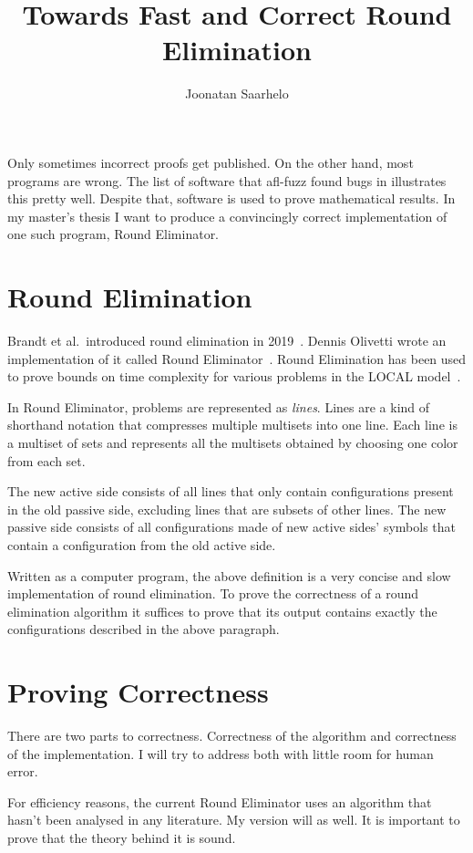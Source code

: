 \documentclass{article}
\title{Towards Fast and Correct Round Elimination}
\author{Joonatan Saarhelo}
\begin{document}
\maketitle

Only sometimes incorrect proofs get published. On the other hand, most programs are wrong. The list of software that afl-fuzz\cite{AFL} found bugs in illustrates this pretty well. Despite that, software is used to prove mathematical results. In my master's thesis I want to produce a convincingly correct implementation of one such program, Round Eliminator.

\section{Round Elimination}

Brandt et al.\ introduced round elimination in 2019\ \cite{speedup}. Dennis Olivetti wrote an implementation of it called Round Eliminator\ \cite{RE}. Round Elimination has been used to prove bounds on time complexity for various problems in the LOCAL model\ \cite{tc1, tc2, tc3}.

In Round Eliminator, problems are represented as \emph{lines}. Lines are a kind of shorthand notation that compresses multiple multisets into one line. Each line is a multiset of sets and represents all the multisets obtained by choosing one color from each set.\ \cite{RE}

The new active side consists of all lines that only contain configurations present in the old passive side, excluding lines that are subsets of other lines. The new passive side consists of all configurations made of new active sides' symbols that contain a configuration from the old active side.\ \cite{DA2020}

Written as a computer program, the above definition is a very concise and slow implementation of round elimination. To prove the correctness of a round elimination algorithm it suffices to prove that its output contains exactly the configurations described in the above paragraph.

\section{Proving Correctness}

There are two parts to correctness. Correctness of the algorithm and correctness of the implementation. I will try to address both with little room for human error.

For efficiency reasons, the current Round Eliminator uses an algorithm that hasn't been analysed in any literature. My version will as well. It is important to prove that the theory behind it is sound.
\end{document}
